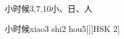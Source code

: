 \begin{entry}{小时候}{3,7,10}{⼩、⽇、⼈}
  \begin{phonetics}{小时候}{xiao3 shi2 hou5}[][HSK 2]
  \end{phonetics}
\end{entry}
